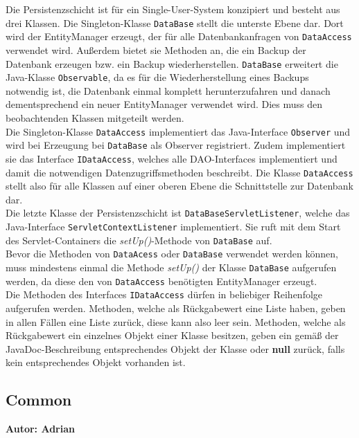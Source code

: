 \documentclass[fontsize=12pt,paper=a4,twoside]{scrartcl}
\begin{document}
Die Persistenzschicht ist für ein Single-User-System konzipiert und besteht aus drei Klassen. Die Singleton-Klasse \texttt{DataBase} stellt die unterste Ebene dar. Dort wird der EntityManager erzeugt, der für alle Datenbankanfragen von \texttt{DataAccess} verwendet wird. Außerdem bietet sie Methoden an, die ein Backup der Datenbank erzeugen bzw. ein Backup wiederherstellen. \texttt{DataBase} erweitert die Java-Klasse \texttt{Observable}, da es für die Wiederherstellung eines Backups notwendig ist, die Datenbank einmal komplett herunterzufahren und danach dementsprechend ein neuer EntityManager verwendet wird. Dies muss den beobachtenden Klassen mitgeteilt werden.\\
Die Singleton-Klasse \texttt{DataAccess} implementiert das Java-Interface \texttt{Observer} und wird bei Erzeugung bei \texttt{DataBase} als Observer registriert. Zudem implementiert sie das Interface \texttt{IDataAccess}, welches alle DAO-Interfaces implementiert und damit die notwendigen Datenzugriffsmethoden beschreibt. Die Klasse \texttt{DataAccess} stellt also für alle Klassen auf einer oberen Ebene die Schnittstelle zur Datenbank dar.\\
Die letzte Klasse der Persistenzschicht ist \texttt{DataBaseServletListener}, welche das Java-Interface \texttt{ServletContextListener} implementiert. Sie ruft mit dem Start des Servlet-Containers die \textit{setUp()}-Methode von \texttt{DataBase} auf.\\

Bevor die Methoden von \texttt{DataAcess} oder \texttt{DataBase} verwendet werden können, muss mindestens einmal die Methode \textit{setUp()} der Klasse \texttt{DataBase} aufgerufen werden, da diese den von \texttt{DataAccess} benötigten EntityManager erzeugt.\\
Die Methoden des Interfaces \texttt{IDataAccess} dürfen in beliebiger Reihenfolge aufgerufen werden. Methoden, welche als Rückgabewert eine Liste haben, geben in allen Fällen eine Liste zurück, diese kann also leer sein. Methoden, welche als Rückgabewert ein einzelnes Objekt einer Klasse besitzen, geben ein gemäß der JavaDoc-Beschreibung entsprechendes Objekt der Klasse oder \textbf{null} zurück, falls kein entsprechendes Objekt vorhanden ist. 





\subsection{Common}
\label{subsec:Common}
\textbf{Autor: Adrian}\\
\end{document}

